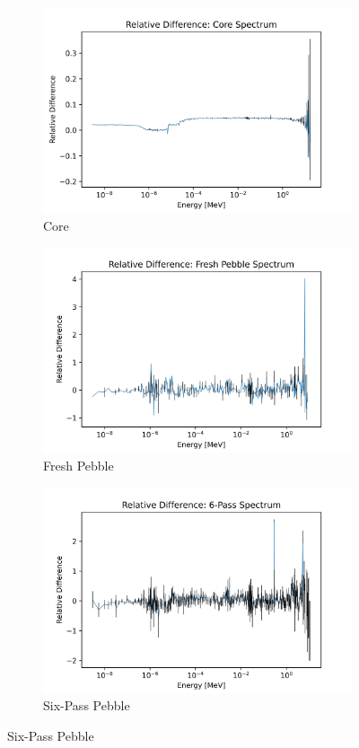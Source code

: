 \begin{figure}[h!]
\centering
%
\begin{subfigure}{0.25\textwidth}
  \includegraphics[width=0.95\linewidth]{figures/reldiff_core_spec}
  \caption{Core}
  \label{fig:diff-core}
\end{subfigure}%
%
\begin{subfigure}{0.25\textwidth}
  \includegraphics[width=0.95\linewidth]{figures/reldiff_fresh_spec}
  \caption{Fresh Pebble}
  \label{fig:diff-fresh}
\end{subfigure}%
%
\begin{subfigure}{0.25\textwidth}
  \includegraphics[width=0.95\linewidth]{figures/reldiff_six_spec}
  \caption{Six-Pass Pebble}
  \label{fig:diff-six}
\end{subfigure}%


\end{figure}
